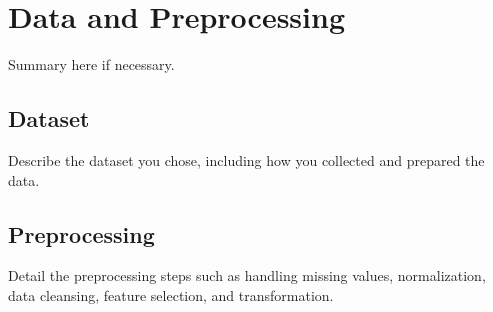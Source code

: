 \chapter{Data and Preprocessing}
\label{ch:data}

Summary here if necessary.

\section{Dataset}
Describe the dataset you chose, including how you collected and prepared the data.

\section{Preprocessing}
Detail the preprocessing steps such as handling missing values, normalization, data cleansing, feature selection, and transformation.